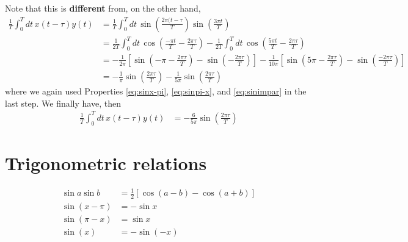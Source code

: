 \documentclass{article}
\begin{document}
Note that this is {\bf different} from, on the other hand, 
\begin{align}
  \frac{1}{T} \int_0^T dt\, x(t-\tau) y(t) &=
  \frac{1}{T} \int_0^T dt\, \sin\left( \frac{2\pi (t-\tau}{T}\right) \sin\left( \frac{3\pi t}{T}\right) \\
  &= \frac{1}{2T} \int_0^T dt\, \cos \left( \frac{-\pi t}{T} - \frac{2\pi \tau}{T}\right)
  -  \frac{1}{2T} \int_0^T dt\, \cos \left( \frac{5\pi t}{T} - \frac{2\pi \tau}{T}\right) \\
  &= 
  -\frac{1}{2\pi} \left[
    \sin\left(-\pi - \frac{2\pi\tau}{T} \right)
    - \sin\left(-\frac{2\pi\tau}{T} \right)
  \right]
  -\frac{1}{10\pi} \left[
    \sin\left(5\pi - \frac{2\pi\tau}{T} \right)
    - \sin\left(\frac{-2\pi\tau}{T} \right)
  \right] \\
  &= -\frac{1}{\pi} 
    \sin\left(\frac{2\pi\tau}{T} \right)
  -\frac{1}{5\pi}
    \sin\left(\frac{2\pi\tau}{T} \right)
\end{align}
where we again used Properties \ref{eq:sinx-pi}, \ref{eq:sinpi-x}, and \ref{eq:sinimpar} in the last step. We finally have, then
\begin{align}
  \frac{1}{T} \int_0^T dt\, x(t-\tau) y(t) &=
 -\frac{6}{5\pi} 
    \sin\left(\frac{2\pi\tau}{T} \right)
\end{align}

% 


\appendix

\section*{Trigonometric relations}

\begin{align}
  \sin a \sin b &= \frac{1}{2}\left[ 
  \cos(a-b) - \cos(a+b)
\right]\label{eq:sinasinb} \\
\sin(x-\pi) &= -\sin x \label{eq:sinx-pi} \\
\sin(\pi-x) &= \sin x \label{eq:sinpi-x} \\
\sin(x) &= - \sin(-x) \label{eq:sinimpar}
\end{align}
\end{document}
